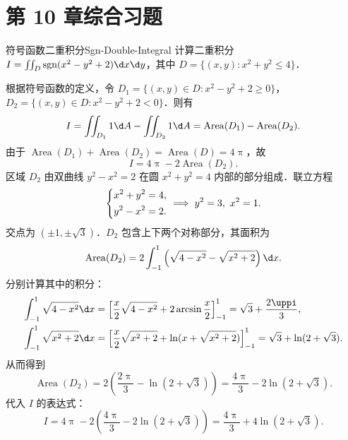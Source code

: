 \section{第 10 章综合习题}

\begin{problem}{符号函数二重积分}{Sgn-Double-Integral}
    计算二重积分 $I = \iint_{D} \operatorname{sgn}(x^2 - y^2 + 2) \d x \d y$，其中 $D = \{(x, y) : x^2 + y^2 \le 4\}$．
\end{problem}

\begin{solution}
    根据符号函数的定义，令 $D_1 = \{(x, y) \in D : x^2 - y^2 + 2 \ge 0\}$，$D_2 = \{(x, y) \in D : x^2 - y^2 + 2 < 0\}$．则有
    \begin{equation}
        I = \iint_{D_1} 1 \d A - \iint_{D_2} 1 \d A = \operatorname{Area}(D_1) - \operatorname{Area}(D_2).
    \end{equation}
    由于 $\operatorname{Area}(D_1) + \operatorname{Area}(D_2) = \operatorname{Area}(D) = 4\uppi$，故
    \begin{equation}
        I = 4\uppi - 2\operatorname{Area}(D_2).
    \end{equation}
    区域 $D_2$ 由双曲线 $y^2 - x^2 = 2$ 在圆 $x^2 + y^2 = 4$ 内部的部分组成．联立方程
    \begin{equation}
        \begin{dcases}
            x^2 + y^2 = 4, \\
            y^2 - x^2 = 2.
        \end{dcases} \implies y^2 = 3, \ x^2 = 1.
    \end{equation}
    交点为 $(\pm 1, \pm \sqrt{3})$．$D_2$ 包含上下两个对称部分，其面积为
    \begin{equation}
        \operatorname{Area}(D_2) = 2 \int_{-1}^1 \left( \sqrt{4-x^2} - \sqrt{x^2+2} \right) \d x.
    \end{equation}
    分别计算其中的积分：
    \begin{equation}
        \begin{aligned}
            \int_{-1}^1 \sqrt{4-x^2} \d x & = \left[ \frac{x}{2}\sqrt{4-x^2} + 2\arcsin \frac{x}{2} \right]_{-1}^1 = \sqrt{3} + \frac{2\uppi}{3}, \\
            \int_{-1}^1 \sqrt{x^2+2} \d x & = \left[ \frac{x}{2}\sqrt{x^2+2} + \ln(x + \sqrt{x^2+2}) \right]_{-1}^1 = \sqrt{3} + \ln(2+\sqrt{3}).
        \end{aligned}
    \end{equation}
    从而得到
    \begin{equation}
        \operatorname{Area}(D_2) = 2 \left( \frac{2\uppi}{3} - \ln(2+\sqrt{3}) \right) = \frac{4\uppi}{3} - 2\ln(2+\sqrt{3}).
    \end{equation}
    代入 $I$ 的表达式：
    \begin{equation}
        I = 4\uppi - 2 \left( \frac{4\uppi}{3} - 2\ln(2+\sqrt{3}) \right) = \frac{4\uppi}{3} + 4\ln(2+\sqrt{3}).
    \end{equation}


\end{solution}
